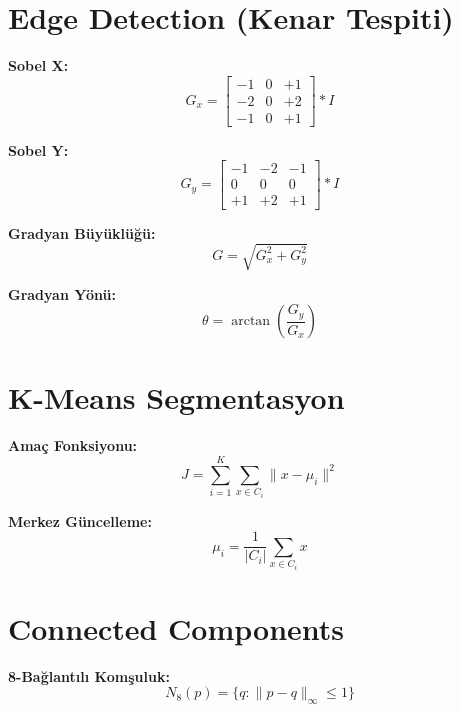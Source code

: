 \documentclass[12pt,a4paper]{article}
\begin{document}
\section{Edge Detection (Kenar Tespiti)}

\textbf{Sobel X:}
\begin{equation}
G_x = \begin{bmatrix} -1 & 0 & +1 \\ -2 & 0 & +2 \\ -1 & 0 & +1 \end{bmatrix} * I
\end{equation}

\textbf{Sobel Y:}
\begin{equation}
G_y = \begin{bmatrix} -1 & -2 & -1 \\ 0 & 0 & 0 \\ +1 & +2 & +1 \end{bmatrix} * I
\end{equation}

\textbf{Gradyan Büyüklüğü:}
\begin{equation}
G = \sqrt{G_x^2 + G_y^2}
\end{equation}

\textbf{Gradyan Yönü:}
\begin{equation}
\theta = \arctan\left(\frac{G_y}{G_x}\right)
\end{equation}

\section{K-Means Segmentasyon}

\textbf{Amaç Fonksiyonu:}
\begin{equation}
J = \sum_{i=1}^{K} \sum_{x \in C_i} \|x - \mu_i\|^2
\end{equation}

\textbf{Merkez Güncelleme:}
\begin{equation}
\mu_i = \frac{1}{|C_i|} \sum_{x \in C_i} x
\end{equation}

\section{Connected Components}

\textbf{8-Bağlantılı Komşuluk:}
\begin{equation}
N_8(p) = \{q : \|p - q\|_\infty \leq 1\}
\end{equation}
\end{document}
